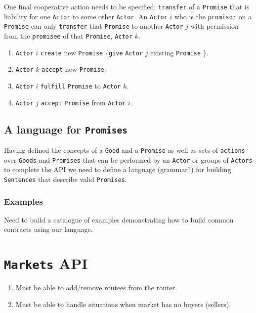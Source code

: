 \documentclass[a4paper]{article}
\begin{document}
One final cooperative action needs to be specified: \texttt{transfer} of a \texttt{Promise} that is liability for one \texttt{Actor} to some other \texttt{Actor}.  An \texttt{Actor} $i$ who is the \texttt{promisor} on a \texttt{Promise} can only \texttt{transfer} that \texttt{Promise} to another \texttt{Actor} $j$ with permission from the \texttt{promisee} of that \texttt{Promise}, \texttt{Actor} $k$. 
\begin{enumerate}
	\item \texttt{Actor} $i$ \texttt{create} new \texttt{Promise} \{\texttt{give} \texttt{Actor} $j$ existing \texttt{Promise} \}.
	\item \texttt{Actor} $k$ \texttt{accept} new \texttt{Promise}.
	\item \texttt{Actor} $i$ \texttt{fulfill} \texttt{Promise} to \texttt{Actor} $k$.
	\item \texttt{Actor} $j$ \texttt{accept} \texttt{Promise} from \texttt{Actor} $i$.
\end{enumerate}

\subsection{A language for \texttt{Promises}}
Having defined the concepts of a \texttt{Good} and a \texttt{Promise} as well as sets of \texttt{actions} over \texttt{Goods} and \texttt{Promises} that can be performed by an \texttt{Actor} or groups of \texttt{Actors} to complete the API we need to define a language (grammar?) for building \texttt{Sentences} that describe valid \texttt{Promises}. 

\subsubsection{Examples}
Need to build a catalogue of examples demonstrating how to build common contracts using our language.


\section{\texttt{Markets} API}

\begin{enumerate}
	\item Must be able to add/remove routees from the router.
	\item Must be able to handle situations when market has no buyers (sellers).
\end{enumerate}
\end{document}
